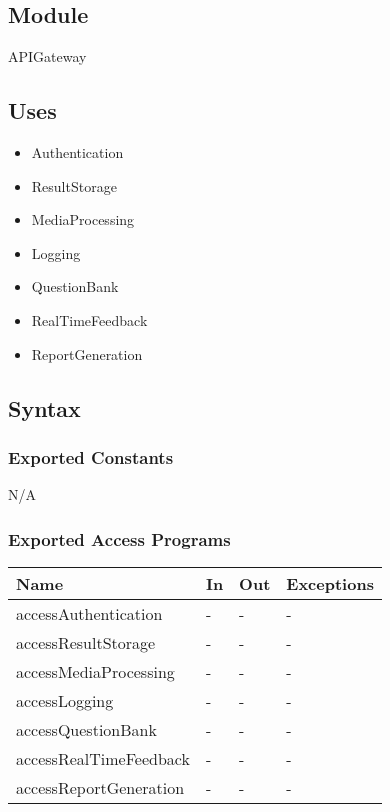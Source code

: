 \documentclass[12pt, titlepage]{article}
\begin{document}
\subsection{Module}

APIGateway

\subsection{Uses}

\begin{itemize}
  \item Authentication
  \item ResultStorage
  \item MediaProcessing
  \item Logging
  \item QuestionBank
  \item RealTimeFeedback
  \item ReportGeneration
\end{itemize}

\subsection{Syntax}

\subsubsection{Exported Constants}

N/A

\subsubsection{Exported Access Programs}

\begin{center}
\begin{tabular}{p{8cm} p{4cm} p{2cm} p{2cm}}
\hline
\textbf{Name} & \textbf{In} & \textbf{Out} & \textbf{Exceptions} \\
\hline
accessAuthentication & - & - & - \\
accessResultStorage & - & - & - \\
accessMediaProcessing & - & - & - \\
accessLogging & - & - & - \\
accessQuestionBank & - & - & - \\
accessRealTimeFeedback & - & - & - \\
accessReportGeneration & - & - & - \\
\hline
\end{tabular}
\end{center}
\end{document}
